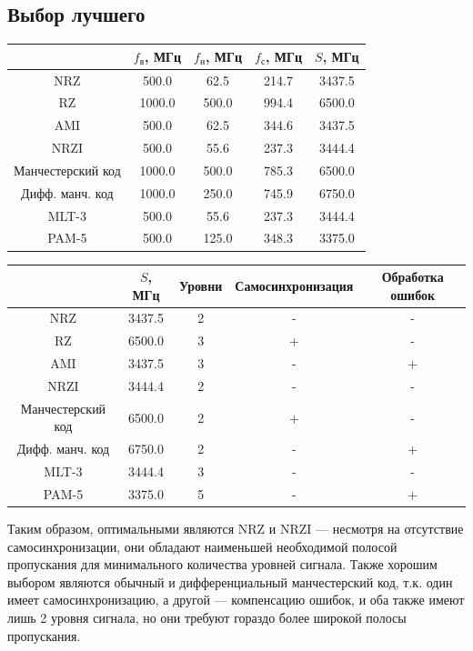 \subsection{Выбор лучшего}
\begin{center}
    \begin{tabular}{c|cccc}
        & $f_\mathrm{\text{в}}$, МГц
        & $f_\mathrm{\text{н}}$, МГц
        & $f_\mathrm{\text{с}}$, МГц
        & $S$, МГц \\ \hline
        NRZ               &  500.0 &  62.5 & 214.7 & 3437.5 \\
        RZ                & 1000.0 & 500.0 & 994.4 & 6500.0 \\
        AMI               &  500.0 &  62.5 & 344.6 & 3437.5 \\
        NRZI              &  500.0 &  55.6 & 237.3 & 3444.4 \\
        Манчестерский код & 1000.0 & 500.0 & 785.3 & 6500.0 \\
        Дифф. манч. код   & 1000.0 & 250.0 & 745.9 & 6750.0 \\
        MLT-3             &  500.0 &  55.6 & 237.3 & 3444.4 \\
        PAM-5             &  500.0 & 125.0 & 348.3 & 3375.0 \\
    \end{tabular}
\end{center}

\begin{center}
    \begin{tabular}{c|cccc}
        & $S$, МГц
        & Уровни
        & Самосинхронизация
        & Обработка ошибок \\ \hline
        NRZ               & 3437.5 & 2 & - & - \\
        RZ                & 6500.0 & 3 & + & - \\
        AMI               & 3437.5 & 3 & - & + \\
        NRZI              & 3444.4 & 2 & - & - \\
        Манчестерский код & 6500.0 & 2 & + & - \\
        Дифф. манч. код   & 6750.0 & 2 & - & + \\
        MLT-3             & 3444.4 & 3 & - & - \\
        PAM-5             & 3375.0 & 5 & - & + \\
    \end{tabular}
\end{center}

Таким образом, оптимальными являются NRZ и NRZI --- несмотря на отсутствие самосинхронизации,
они обладают наименьшей необходимой полосой пропускания для минимального количества уровней сигнала.
Также хорошим выбором являются обычный и дифференциальный манчестерский код, т.к.
один имеет самосинхронизацию, а другой --- компенсацию ошибок, и оба также имеют лишь 2 уровня сигнала,
но они требуют гораздо более широкой полосы пропускания.

